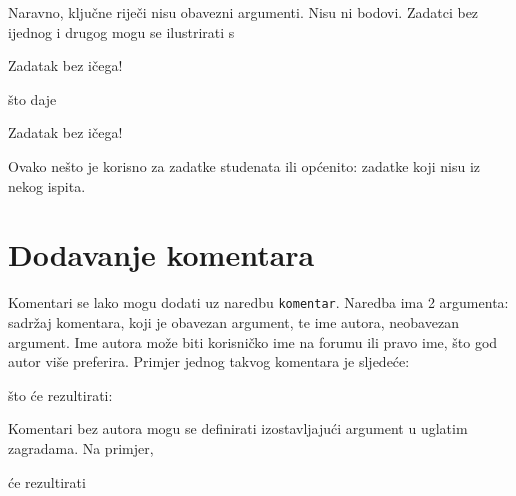 \documentclass{studosi-workbook}
\begin{document}
    Naravno, ključne riječi nisu obavezni argumenti. Nisu ni bodovi. Zadatci bez ijednog i drugog mogu se ilustrirati s
    
    \begin{kod}
   	\begin{zadatak}
   		Zadatak bez ičega!
   	\end{zadatak}
    \end{kod}
    
    što daje
    
    \begin{zadatak}
    	Zadatak bez ičega!
    \end{zadatak}
    \vspace*{20pt}
    
    Ovako nešto je korisno za zadatke studenata ili općenito: zadatke koji nisu iz nekog ispita.
    
    
    \section{Dodavanje komentara}
    Komentari se lako mogu dodati uz naredbu \texttt{komentar}. Naredba ima 2 argumenta: sadržaj komentara, koji je obavezan argument, te ime autora, neobavezan argument. Ime autora može biti korisničko ime na forumu ili pravo ime, što god autor više preferira. Primjer jednog takvog komentara je sljedeće:
    
    \begin{kod}
    \end{kod}

	što će rezultirati:
	

	\vspace*{8pt}

	Komentari bez autora mogu se definirati izostavljajući argument u uglatim zagradama. Na primjer,
	
	\begin{kod}
	\end{kod}

	će rezultirati
	

	\vspace*{8pt}
\end{document}
